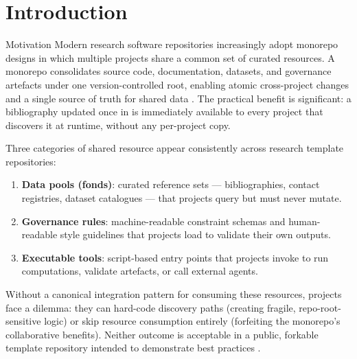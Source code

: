 \documentclass[
  ignorenonframetext,
]{beamer}
\author{\texorpdfstring{}{}}
\date{}
\providecommand{\tightlist}{%
  \setlength{\itemsep}{0pt}\setlength{\parskip}{0pt}}
\begin{document}
\section{Introduction}\label{introduction}

\begin{frame}{Motivation}
\protect{}\label{motivation}
Modern research software repositories increasingly adopt monorepo
designs in which multiple projects share a common set of curated
resources. A monorepo consolidates source code, documentation, datasets,
and governance artefacts under one version-controlled root, enabling
atomic cross-project changes and a single source of truth for shared
data . The practical benefit is significant: a
bibliography updated once in
 is immediately
available to every project that discovers it at runtime, without any
per-project copy.

Three categories of shared resource appear consistently across research
template repositories:

\begin{enumerate}
\tightlist
\item
  \textbf{Data pools (fonds)}: curated reference sets ---
  bibliographies, contact registries, dataset catalogues --- that
  projects query but must never mutate.
\item
  \textbf{Governance rules}: machine-readable constraint schemas and
  human-readable style guidelines that projects load to validate their
  own outputs.
\item
  \textbf{Executable tools}: script-based entry points that projects
  invoke to run computations, validate artefacts, or call external
  agents.
\end{enumerate}

Without a canonical integration pattern for consuming these resources,
projects face a dilemma: they can hard-code discovery paths (creating
fragile, repo-root-sensitive logic) or skip resource consumption
entirely (forfeiting the monorepo's collaborative benefits). Neither
outcome is acceptable in a public, forkable template repository intended
to demonstrate best practices .
\end{frame}
\end{document}
